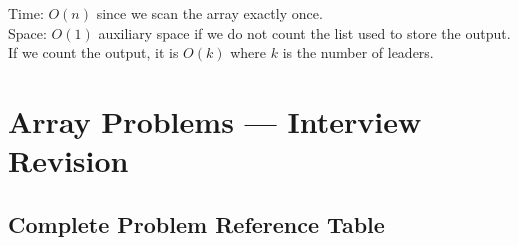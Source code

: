 \documentclass[12pt,a4paper,oneside]{book}
\begin{document}
\begin{complexity}
Time: $O(n)$ since we scan the array exactly once.\\
Space: $O(1)$ auxiliary space if we do not count the list used to store the output. If we count the output, it is $O(k)$ where $k$ is the number of leaders.
\end{complexity}

\chapter{Array Problems --- Interview Revision}

\section{Complete Problem Reference Table}
\end{document}
